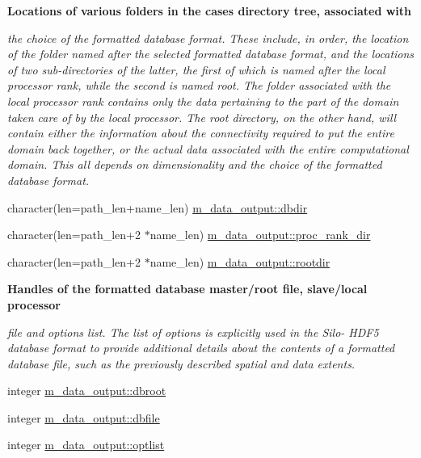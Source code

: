 \begin{Indent}\textbf{ Locations of various folders in the case\textquotesingle{}s directory tree, associated with}\par
{\em the choice of the formatted database format. These include, in order, the location of the folder named after the selected formatted database format, and the locations of two sub-\/directories of the latter, the first of which is named after the local processor rank, while the second is named \textquotesingle{}root\textquotesingle{}. The folder associated with the local processor rank contains only the data pertaining to the part of the domain taken care of by the local processor. The root directory, on the other hand, will contain either the information about the connectivity required to put the entire domain back together, or the actual data associated with the entire computational domain. This all depends on dimensionality and the choice of the formatted database format. }\begin{DoxyCompactItemize}
\item 
character(len=path\+\_\+len+name\+\_\+len) \hyperlink{namespacem__data__output_a5b3bbbc3392c3196bee8219d550fd9aa}{m\+\_\+data\+\_\+output\+::dbdir}
\item 
character(len=path\+\_\+len+2 $\ast$name\+\_\+len) \hyperlink{namespacem__data__output_a135059f1848c713ebe5156659da1929a}{m\+\_\+data\+\_\+output\+::proc\+\_\+rank\+\_\+dir}
\item 
character(len=path\+\_\+len+2 $\ast$name\+\_\+len) \hyperlink{namespacem__data__output_ae33b2fd4aa2594f18dd34e20b66813bb}{m\+\_\+data\+\_\+output\+::rootdir}
\end{DoxyCompactItemize}
\end{Indent}
\begin{Indent}\textbf{ Handles of the formatted database master/root file, slave/local processor}\par
{\em file and options list. The list of options is explicitly used in the Silo-\/ H\+D\+F5 database format to provide additional details about the contents of a formatted database file, such as the previously described spatial and data extents. }\begin{DoxyCompactItemize}
\item 
integer \hyperlink{namespacem__data__output_a5cd7e79fd8f57db6362eeae681f8a9d8}{m\+\_\+data\+\_\+output\+::dbroot}
\item 
integer \hyperlink{namespacem__data__output_aec51d3900a580048a3c9f5bddfa38ed2}{m\+\_\+data\+\_\+output\+::dbfile}
\item 
integer \hyperlink{namespacem__data__output_a21c768216c63e43ea9e1f13e498a3558}{m\+\_\+data\+\_\+output\+::optlist}
\end{DoxyCompactItemize}
\end{Indent}
